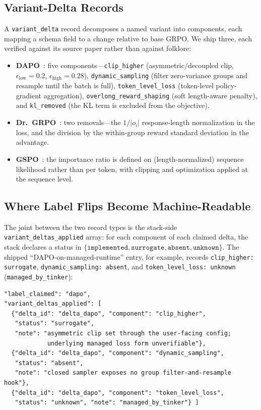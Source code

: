\documentclass{article}
\providecommand{\eps}{\ensuremath{\epsilon}}
\begin{document}
\subsection{Variant-Delta Records}
\label{sec:p6-schema-delta}
A \texttt{variant_delta} record decomposes a named variant into components,
each mapping a schema field to a change relative to base GRPO. We ship three,
each verified against its source paper rather than against folklore:

\begin{itemize}[leftmargin=1.5em, itemsep=0.15em]
  \item \textbf{DAPO}~\citep{yu2025dapo}: five components---\texttt{clip_higher} (asymmetric/decoupled clip,
        $\eps_{\text{low}}{=}0.2$, $\eps_{\text{high}}{=}0.28$),
        \texttt{dynamic_sampling} (filter zero-variance groups and resample
        until the batch is full), \texttt{token_level_loss} (token-level
        policy-gradient aggregation), \texttt{overlong_reward_shaping} (soft
        length-aware penalty), and \texttt{kl_removed} (the KL term is
        excluded from the objective).
  \item \textbf{Dr.~GRPO}~\citep{tong2025drgrpo}: two removals---the
        $1/|o_i|$ response-length normalization in the loss, and the division
        by the within-group reward standard deviation in the advantage.
  \item \textbf{GSPO}~\citep{qwen2025gspo}: the importance ratio is defined on
        (length-normalized) sequence likelihood rather than per token, with
        clipping and optimization applied at the sequence level.
\end{itemize}

\subsection{Where Label Flips Become Machine-Readable}
\label{sec:p6-schema-status}
The joint between the two record types is the stack-side
\texttt{variant_deltas_applied} array: for each component of each claimed
delta, the stack declares a status in
$\{\texttt{implemented}, \texttt{surrogate}, \texttt{absent},
\texttt{unknown}\}$. The shipped ``DAPO-on-managed-runtime'' entry, for
example, records \texttt{clip_higher: surrogate},
\texttt{dynamic_sampling: absent}, and \texttt{token_level_loss: unknown}
(\texttt{managed_by_tinker}):

\begin{lstlisting}[basicstyle=\ttfamily\scriptsize, frame=single,
  caption={Excerpt from \texttt{entries/tinker_dapo_qwen3.5-4b_gsm8k.json}.},
  label={lst:p6-dapo-entry}]
"label_claimed": "dapo",
"variant_deltas_applied": [
  {"delta_id": "delta_dapo", "component": "clip_higher",
   "status": "surrogate",
   "note": "asymmetric clip set through the user-facing config;
            underlying managed loss form unverifiable"},
  {"delta_id": "delta_dapo", "component": "dynamic_sampling",
   "status": "absent",
   "note": "closed sampler exposes no group filter-and-resample hook"},
  {"delta_id": "delta_dapo", "component": "token_level_loss",
   "status": "unknown", "note": "managed_by_tinker"} ]
\end{lstlisting}
\end{document}

